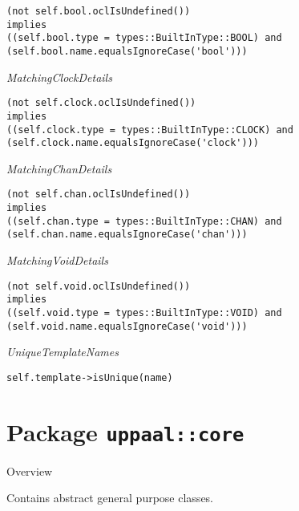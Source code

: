 \begin{longdescription}
\begin{longdescription}
		\begin{lstlisting}[breaklines=true]
(not self.bool.oclIsUndefined())
implies
((self.bool.type = types::BuiltInType::BOOL) and (self.bool.name.equalsIgnoreCase('bool')))		\end{lstlisting}
	\item[\small\textit{MatchingClockDetails}] ~ 
	\nopagebreak
	
		\begin{lstlisting}[breaklines=true]
(not self.clock.oclIsUndefined())
implies
((self.clock.type = types::BuiltInType::CLOCK) and (self.clock.name.equalsIgnoreCase('clock')))		\end{lstlisting}
	\item[\small\textit{MatchingChanDetails}] ~ 
	\nopagebreak
	
		\begin{lstlisting}[breaklines=true]
(not self.chan.oclIsUndefined())
implies
((self.chan.type = types::BuiltInType::CHAN) and (self.chan.name.equalsIgnoreCase('chan')))		\end{lstlisting}
	\item[\small\textit{MatchingVoidDetails}] ~ 
	\nopagebreak
	
		\begin{lstlisting}[breaklines=true]
(not self.void.oclIsUndefined())
implies
((self.void.type = types::BuiltInType::VOID) and (self.void.name.equalsIgnoreCase('void')))		\end{lstlisting}
	\item[\small\textit{UniqueTemplateNames}] ~ 
	\nopagebreak
	
		\begin{lstlisting}[breaklines=true]
self.template->isUnique(name)		\end{lstlisting}
			\end{longdescription}
	
	\end{longdescription}
	
			\newpage
		\section{Package \bfseries \texttt{uppaal::core}\normalfont}
		
		\begin{longdescription}
		\item[Overview]			
				

	

		Contains abstract general purpose classes.		
		\end{longdescription}
	


